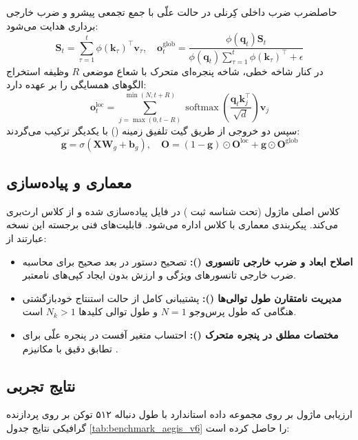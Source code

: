 حاصلضرب ضرب داخلی کِرنلی در حالت علّی با جمع تجمعی پیشرو و ضرب خارجی برداری هدایت می‌شود:
\begin{equation}
\mathbf{S}_t = \sum_{\tau=1}^t \phi(\mathbf{k}_\tau)^\top \mathbf{v}_\tau, \quad \mathbf{o}_t^{\text{glob}} = \frac{\phi(\mathbf{q}_t) \mathbf{S}_t}{\phi(\mathbf{q}_t) \sum_{\tau=1}^t \phi(\mathbf{k}_\tau)^\top + \epsilon}
\end{equation}
در کنار شاخه خطی، شاخه پنجره‌ای متحرک با شعاع موضعی $R$ وظیفه استخراج الگوهای همسایگی را بر عهده دارد:
\begin{equation}
\mathbf{o}_t^{\text{loc}} = \sum_{j=\max(0, t-R)}^{\min(N, t+R)} \operatorname{softmax}\left(\frac{\mathbf{q}_t \mathbf{k}_j^\top}{\sqrt{d}}\right) \mathbf{v}_j
\end{equation}
سپس دو خروجی از طریق گیت تلفیق زمینه () با یکدیگر ترکیب می‌گردند:
\begin{equation}
\mathbf{g} = \sigma(\mathbf{X} \mathbf{W}_g + \mathbf{b}_g), \quad \mathbf{O} = (1 - \mathbf{g}) \odot \mathbf{O}^{\text{loc}} + \mathbf{g} \odot \mathbf{O}^{\text{glob}}
\end{equation}

\subsection{معماری و پیاده‌سازی}
کلاس اصلی ماژول  (تحت شناسه ثبت ) در فایل  پیاده‌سازی شده و از کلاس  ارث‌بری می‌کند. پیکربندی معماری با کلاس  اداره می‌شود. قابلیت‌های فنی برجسته این نسخه عبارتند از:
\begin{itemize}
    \item \textbf{اصلاح ابعاد و ضرب خارجی تانسوری ():} تصحیح دستور  در بعد صحیح برای محاسبه ضرب خارجی تانسورهای ویژگی و ارزش بدون ایجاد کپی‌های نامعتبر.
    \item \textbf{مدیریت نامتقارن طول توالی‌ها ():} پشتیبانی کامل از حالت استنتاج خودبازگشتی هنگامی که طول پرس‌وجو $N=1$ و طول توالی کلیدها $N_k > 1$ است.
    \item \textbf{مختصات مطلق در پنجره متحرک ():} احتساب متغیر آفست  در پنجره علّی برای تطابق دقیق با مکانیزم .
\end{itemize}

\subsection{نتایج تجربی}
ارزیابی ماژول  بر روی مجموعه داده استاندارد  با طول دنباله ۵۱۲ توکن بر روی پردازنده گرافیکی نتایج جدول \ref{tab:benchmark_aegis_v6} را حاصل کرده است:

